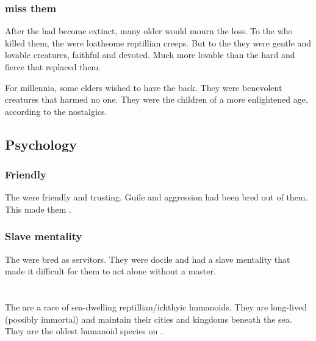 \subsubsection{\QuilJaaran{} miss them}
After the \loculs{} had become extinct, many older \quiljaaran{} would mourn the loss. 
To the \nephilim{} who killed them, the \loculs{} were loathsome reptillian creeps.
But to the \quiljaaran{} they were gentle and lovable creatures, faithful and devoted. 
Much more lovable than the hard and fierce \scathae{} that replaced them. 

For millennia, some \quiljaaran{} elders wished to have the \loculs{} back. 
They were benevolent creatures that harmed no one. 
They were the children of a more enlightened age, according to the nostalgics. 









\subsection{Psychology}





\subsubsection{Friendly}
The \loculs{} were friendly and trusting. 
Guile and aggression had been bred out of them. 
This made them . 





\subsubsection{Slave mentality}
The \loculs{} were bred as servitors. 
They were docile and had a slave mentality that made it difficult for them to act alone without a master. 















\section{\Nagae}
The \nagae{} are a race of sea-dwelling reptillian/ichthyic humanoids. 
They are long-lived (possibly immortal) and maintain their cities and kingdoms beneath the sea. They are the oldest humanoid species on \Miith{}. 

